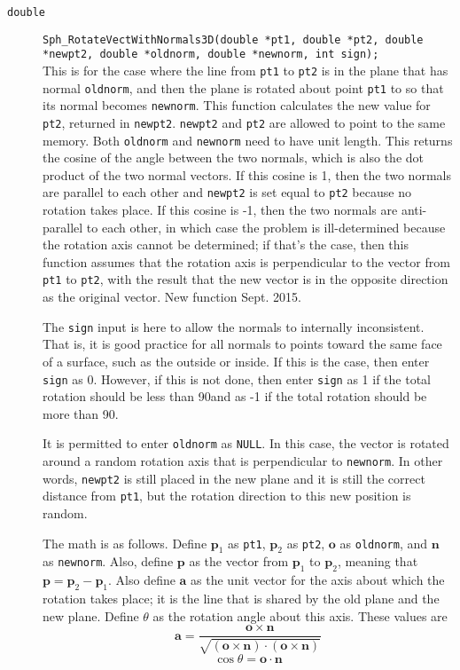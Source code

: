 \documentclass[11pt]{article}
\newcommand {\ttt} {\texttt}
\begin{document}
\begin{description}
\item[\ttt{double}]
\ttt{Sph\_RotateVectWithNormals3D(double *pt1, double *pt2, double *newpt2, double *oldnorm, double *newnorm, int sign);}
\hfill \\
This is for the case where the line from \ttt{pt1} to \ttt{pt2} is in the plane that has normal \ttt{oldnorm}, and then the plane is rotated about point \ttt{pt1} to so that its normal becomes \ttt{newnorm}. This function calculates the new value for \ttt{pt2}, returned in \ttt{newpt2}. \ttt{newpt2} and \ttt{pt2} are allowed to point to the same memory. Both \ttt{oldnorm} and \ttt{newnorm} need to have unit length. This returns the cosine of the angle between the two normals, which is also the dot product of the two normal vectors. If this cosine is 1, then the two normals are parallel to each other and \ttt{newpt2} is set equal to \ttt{pt2} because no rotation takes place. If this cosine is -1, then the two normals are anti-parallel to each other, in which case the problem is ill-determined because the rotation axis cannot be determined; if that's the case, then this function assumes that the rotation axis is perpendicular to the vector from \ttt{pt1} to \ttt{pt2}, with the result that the new vector is in the opposite direction as the original vector. New function Sept. 2015.

The \ttt{sign} input is here to allow the normals to internally inconsistent. That is, it is good practice for all normals to points toward the same face of a surface, such as the outside or inside. If this is the case, then enter \ttt{sign} as 0. However, if this is not done, then enter \ttt{sign} as 1 if the total rotation should be less than 90\degree and as -1 if the total rotation should be more than 90\degree.

It is permitted to enter \ttt{oldnorm} as \ttt{NULL}. In this case, the vector is rotated around a random rotation axis that is perpendicular to \ttt{newnorm}. In other words, \ttt{newpt2} is still placed in the new plane and it is still the correct distance from \ttt{pt1}, but the rotation direction to this new position is random.

The math is as follows. Define $\bm{p}_1$ as \ttt{pt1}, $\bm{p}_2$ as \ttt{pt2}, $\bm{o}$ as \ttt{oldnorm}, and $\bm{n}$ as \ttt{newnorm}. Also, define $\bm{p}$ as the vector from $\bm{p}_1$ to $\bm{p}_2$, meaning that $\bm{p} = \bm{p}_2 - \bm{p}_1$. Also define $\bm{a}$ as the unit vector for the axis about which the rotation takes place; it is the line that is shared by the old plane and the new plane. Define $\theta$ as the rotation angle about this axis. These values are
$$\bm{a} = \frac{\bm{o} \times \bm{n}}{\sqrt{(\bm{o} \times \bm{n})\cdot (\bm{o} \times \bm{n})}}$$
$$\cos \theta = \bm{o} \cdot \bm{n}$$


\end{description}
\end{document}
